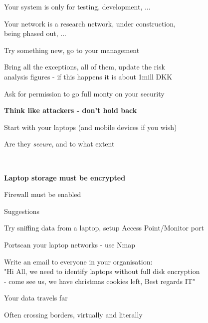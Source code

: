 \documentclass[Screen16to9,17pt,footrule]{foils}
\begin{document}
Your system is only for testing, development, ...

Your network is a research network, under construction, \\
being phased out, ...

Try something new, go to your management

Bring all the exceptions, all of them, update the risk \\
analysis figures - if this happens it is about 1mill DKK

Ask for permission to go full monty on your security

{\bf Think like attackers - don't hold back}



Start with your laptops (and mobile devices if you wish)

Are they \emph{secure}, and to what extent




{~}
\begin{list1}
\item {\bf Laptop storage must be encrypted}
\item Firewall must be enabled
\item Suggestions
\begin{list2}
\item Try sniffing data from a laptop, setup Access Point/Monitor port
\item Portscan your laptop networks - use Nmap
\item Write an email to everyone in your organisation:\\
"Hi All, we need to identify laptops without full disk encryption \\
- come see us, we have christmas cookies left, Best regards IT"
\end{list2}
\end{list1}





\begin{list2}
\item Your data travels far
\item Often crossing borders, virtually and literally
\end{list2}
\end{document}
